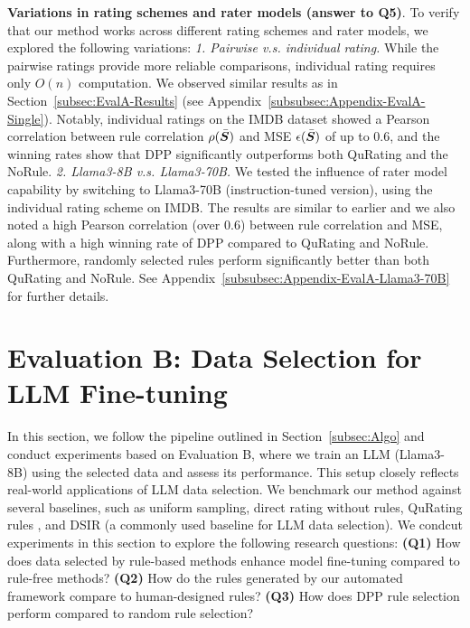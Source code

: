 \documentclass{article}
\newcommand{\bmS}{\bar{\mS}}
\begin{document}
\textbf{Variations in rating schemes and rater models (answer to \textbf{Q5})}.
To verify that our method works across different rating schemes and rater models, we explored the following variations: \textit{1. Pairwise v.s. individual rating.} While the pairwise ratings provide more reliable comparisons, individual rating requires only $O(n)$ computation. We observed similar results as in Section~\ref{subsec:EvalA-Results} (see Appendix~\ref{subsubsec:Appendix-EvalA-Single}). Notably, individual ratings on the IMDB dataset showed a Pearson correlation between rule correlation \( \rho(\bmS) \) and MSE \( \epsilon(\bmS) \) of up to 0.6, and the winning rates show that DPP significantly outperforms both QuRating and the NoRule. \textit{2. Llama3-8B v.s. Llama3-70B.} We tested the influence of rater model capability by switching to Llama3-70B (instruction-tuned version), using the individual rating scheme on IMDB. The results are similar to earlier and we also noted a high Pearson correlation (over 0.6) between rule correlation and MSE, along with a high winning rate of DPP compared to QuRating and NoRule. Furthermore, randomly selected rules perform significantly better than both QuRating and NoRule. See Appendix~\ref{subsubsec:Appendix-EvalA-Llama3-70B} for further details.










\section{Evaluation B: Data Selection for LLM Fine-tuning}\label{sec:EvaluationB}

In this section, we follow the pipeline outlined in Section~\ref{subsec:Algo} and conduct experiments based on Evaluation B, where we train an LLM (Llama3-8B) using the selected data and assess its performance. This setup closely reflects real-world applications of LLM data selection. We benchmark our method against several baselines, such as uniform sampling, direct rating without rules, QuRating rules \citep{wettig2024qurating}, and DSIR \citep{xie2024data} (a commonly used baseline for LLM data selection). We condcut experiments in this section to explore the following research questions: \textbf{(Q1)} How does data selected by rule-based methods enhance model fine-tuning compared to rule-free methods? \textbf{(Q2)} How do the rules generated by our automated framework compare to human-designed rules? \textbf{(Q3)} How does DPP rule selection perform compared to random rule selection?
\end{document}
